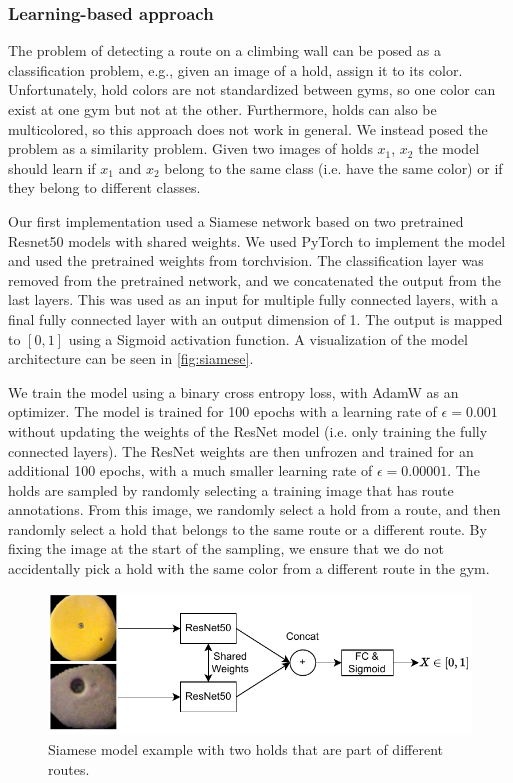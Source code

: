\documentclass[final]{cvpr}
\begin{document}
\subsubsection{Learning-based approach} %
The problem of detecting a route on a climbing wall can be posed as a classification problem, e.g., given an image of a hold, assign it to its color.
Unfortunately, hold colors are not standardized between gyms, so one color can exist at one gym but not at the other. Furthermore, holds can also be multicolored, so this approach does not work in general.
We instead posed the problem as a similarity problem. Given two images of holds $x_1$, $x_2$ the model should learn if $x_1$ and $x_2$ belong to the same class (i.e. have the same color) or if they belong to different classes.


Our first implementation used a Siamese network \cite{Siamese} based on two pretrained Resnet50 \cite{Resnet} models with shared weights.
We used PyTorch \cite{Pytorch} to implement the model and used the pretrained weights from torchvision.
The classification layer was removed from the pretrained network, and we concatenated the output from the last layers. This was used as an input for multiple fully connected layers, with a final fully connected layer with an output dimension of 1. The output is mapped to $[0,1]$ using a Sigmoid activation function. A visualization of the model architecture can be seen in \autoref{fig:siamese}.

We train the model using a binary cross entropy loss, with AdamW \cite{AdamW} as an optimizer. The model is trained for 100 epochs with a learning rate of $\epsilon= 0.001$ without updating the weights of the ResNet model (i.e. only training the fully connected layers).
The ResNet weights are then unfrozen and trained for an additional 100 epochs, with a much smaller learning rate of $\epsilon= 0.00001$.
The holds are sampled by randomly selecting a training image that has route annotations. From this image, we randomly select a hold from a route, and then randomly select a hold that belongs to the same route or a different route. By fixing the image at the start of the sampling, we ensure that we do not accidentally pick a hold with the same color from a different route in the gym.

\begin{figure}
    \centering
    \includegraphics[width= \linewidth]{img/siamese_model.pdf}
    \caption{Siamese model example with two holds that are part of different routes.}
    \label{fig:siamese}
\end{figure}
\end{document}
